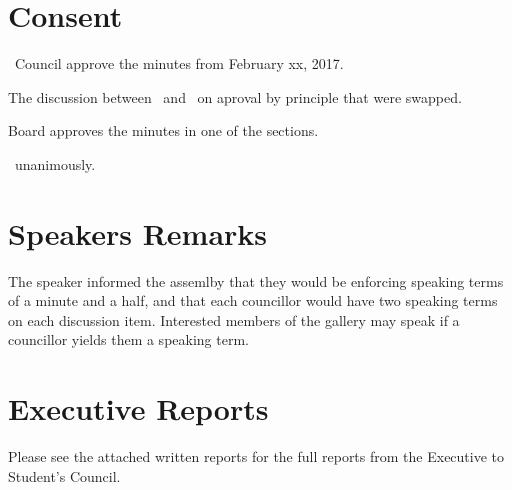 \section*{Consent}

\begin{motion}
    \birt\ Council approve the minutes from February xx, 2017.
    \movers{\seneca}{\jennifer}

    The discussion between \seneca\ and \brian\ on aproval by principle that were 
    swapped.

    Board approves the minutes in one of the sections.

    \carries\ unanimously.
\end{motion}

\section*{Speakers Remarks}

The speaker informed the assemlby that they would be enforcing speaking terms 
of a minute and a half, and that each councillor would have two speaking terms
on each discussion item. Interested members of the gallery may speak if a 
councillor yields them a speaking term.

\section*{Executive Reports}

Please see the attached written reports for the full reports from the Executive
to Student's Council. 

